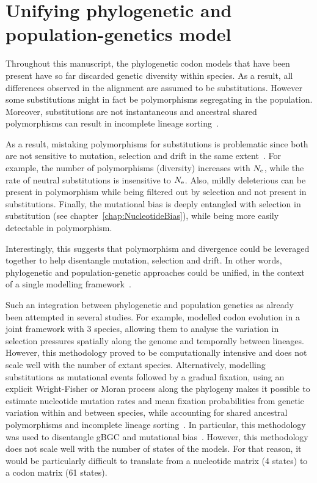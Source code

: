 \section{Unifying phylogenetic and population-genetics model}
\label{sec:unifying-phylogenetic-and-population-genetics-model}

Throughout this manuscript, the phylogenetic codon models that have been present have so far discarded genetic diversity within species.
As a result, all differences observed in the alignment are assumed to be substitutions.
However some substitutions might in fact be polymorphisms segregating in the population.
Moreover, substitutions are not instantaneous and ancestral shared polymorphisms can result in incomplete lineage sorting~\citep{Charlesworth2010}.

As a result, mistaking polymorphisms for substitutions is problematic since both are not sensitive to mutation, selection and drift in the same extent~\citep{Mugal2014}.
For example, the number of polymorphisms (diversity) increases with $N_{\textrm{e}}$, while the rate of neutral substitutions is insensitive to $N_{\textrm{e}}$.
Also, mildly deleterious can be present in polymorphism while being filtered out by selection and not present in substitutions.
Finally, the mutational bias is deeply entangled with selection in substitution (see chapter~\ref{chap:NucleotideBias}), while being more easily detectable in polymorphism.

Interestingly, this suggests that polymorphism and divergence could be leveraged together to help disentangle mutation, selection and drift.
In other words, phylogenetic and population-genetic approaches could be unified, in the context of a single modelling framework~\citep{Thorne2012}.

Such an integration between phylogenetic and population genetics as already been attempted in several studies.
For example, \citet{Wilson2011} modelled codon evolution in a joint framework with $3$ species, allowing them to analyse the variation in selection pressures spatially along the genome and temporally between lineages.
However, this methodology proved to be computationally intensive and does not scale well with the number of extant species.
Alternatively, modelling substitutions as mutational events followed by a gradual fixation, using an explicit Wright-Fisher or Moran process along the phylogeny makes it possible to estimate nucleotide mutation rates and mean fixation probabilities from genetic variation within and between species, while accounting for shared ancestral polymorphisms and incomplete lineage sorting~\citep{DeMaio2013, Schrempf2016, Bergman2018, Schrempf2019}.
In particular, this methodology was used to disentangle \acrshort{gBGC} and mutational bias~\citep{Borges2019, Borges2020}.
However, this methodology does not scale well with the number of states of the models.
For that reason, it would be particularly difficult to translate from a nucleotide matrix (4 states) to a codon matrix (61 states).

